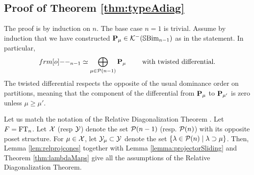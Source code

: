 %
%
%
%

\subsection{Proof of Theorem \ref{thm:typeAdiag}}
\label{subsec:proof}


The proof is by induction on $n$.  The base case $n=1$ is trivial.  Assume by induction that we have constructed ${\mathbf P}_{\mu}\in {\mathcal{K}}^-({\mathbb{S}}{\rm Bim }_{n-1})$ as in the statement.  In particular,
\[
\one_{n-1}\simeq \bigoplus_{\mu \in \PC(n-1)} \PB_{\mu} \qquad \text{ with twisted differential}.
\]
The twisted differential respects the opposite of the usual dominance order on partitions, meaning that the component of the differential from ${\mathbf P}_\mu$ to ${\mathbf P}_{\mu'}$ is zero unless $\mu\geq \mu'$.

Let us match the notation of the Relative Diagonalization Theorem \cite[Theorem 8.2]{ElHog17a}. Let $F = \operatorname{FT}_n$. Let ${\mathcal{X}}$ (resp ${\mathcal{Y}}$) denote the set ${\mathcal{P}}(n-1)$ (resp. ${\mathcal{P}}(n)$) with its opposite poset structure. For $\mu \in {\mathcal{X}}$, let ${\mathcal{Y}}_\mu \subset {\mathcal{Y}}$ denote the set $\{ \lambda \in {\mathcal{P}}(n) \mid \lambda \supset \mu\}$. Then, Lemma \ref{lem:relprojcones} together with Lemma \ref{lemma:projectorSliding} and Theorem \ref{thm:lambdaMaps} give all the assumptions of the Relative Diagonalization Theorem.


